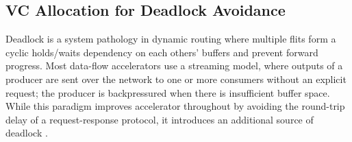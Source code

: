 
\subsection{VC Allocation for Deadlock Avoidance} \label{sec:vc}
Deadlock is a system pathology in dynamic routing where multiple flits form a cyclic holds/waits dependency on each others' buffers and prevent forward progress.
Most data-flow accelerators use a streaming model, where outputs of a producer are sent over the network to one or more consumers
without an explicit request; the producer is backpressured when there is insufficient buffer space. 
While this paradigm improves accelerator throughout by avoiding the round-trip delay of a request-response protocol, it introduces an additional source of deadlock \cite{hansson2007avoiding}. 

